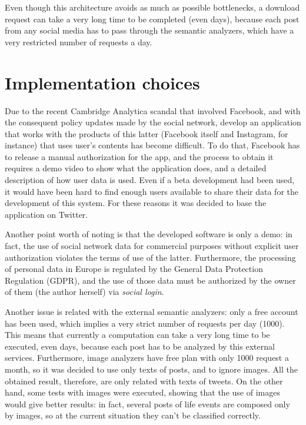 Even though this architecture avoids as much as possible bottlenecks, a download request can take a very long time to be completed (even days), because each post from any social media has to pass through the semantic analyzers, which have a very restricted number of requests a day.

\section{Implementation choices}
\label{sec:choices}
Due to the recent Cambridge Analytica scandal that involved Facebook, and with the consequent policy updates made by the social network, develop an application that works with the products of this latter (Facebook itself and Instagram, for instance) that uses user's contents has become difficult. To do that, Facebook has to release a manual authorization for the app, and the process to obtain it requires a demo video to show what the application does, and a detailed description of how user data is used. Even if a beta development had been used, it would have been hard to find enough users available to share their data for the development of this system. For these reasons it was decided to base the application on Twitter.

Another point worth of noting is that the developed software is only a demo: in fact, the use of social network data for commercial purposes without explicit user authorization violates the terms of use of the latter. Furthermore, the processing of personal data in Europe is regulated by the General Data Protection Regulation (GDPR), and the use of those data must be authorized by the owner of them (the author herself) via \emph{social login}.

Another issue is related with the external semantic analyzers: only a free account has been used, which implies a very strict number of requests per day (1000). This means that currently a computation can take a very long time to be executed, even days, because each post has to be analyzed by this external services. Furthermore, image analyzers have free plan with only 1000 request a month, so it was decided to use only texts of posts, and to ignore images. All the obtained result, therefore, are only related with texts of tweets. On the other hand, some tests with images were executed, showing that the use of images would give better results: in fact, several posts of life events are composed only by images, so at the current situation they can't be classified correctly.

